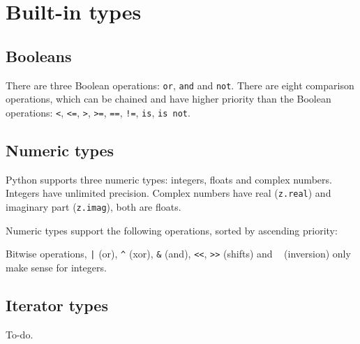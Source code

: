 \section{Built-in types}
\subsection{Booleans}
There are three Boolean operations: \texttt{or}, \texttt{and} and \texttt{not}.
There are eight comparison operations, which can be chained and have higher priority than the Boolean operations:
\texttt{<}, 
\texttt{<=}, 
\texttt{>}, 
\texttt{>=}, 
\texttt{==}, 
\texttt{!=}, 
\texttt{is}, 
\texttt{is not}.

\subsection{Numeric types}
Python supports three numeric types: integers, floats and complex numbers.
Integers have unlimited precision.
Complex numbers have real (\texttt{z.real}) and imaginary part (\texttt{z.imag}),
both are floats.

Numeric types support the following operations, sorted by ascending priority:

Bitwise operations, \texttt{|} (or), \texttt{^} (xor), \texttt{&} (and), \texttt{<<}, \texttt{>>} (shifts) and \texttt{~} (inversion) only make sense for integers.

\subsection{Iterator types}
To-do.

